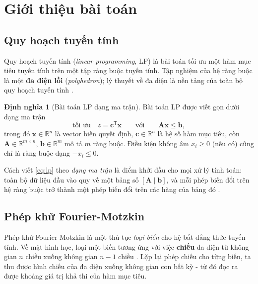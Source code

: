 \documentclass[12pt,a4paper]{article}
\theoremstyle{definition}
\newtheorem{definition}{Định nghĩa}[section]
\newcommand{\R}{\mathbb{R}}
\newcommand{\vx}{\mathbf{x}}
\newcommand{\vc}{\mathbf{c}}
\newcommand{\vb}{\mathbf{b}}
\newcommand{\mA}{\mathbf{A}}
\newcommand{\T}{^{\mathsf T}}
\begin{document}
\bigskip

\section{Giới thiệu bài toán}

\subsection{Quy hoạch tuyến tính}

Quy hoạch tuyến tính (\emph{linear programming}, LP) là bài toán tối ưu một
hàm mục tiêu tuyến tính trên một tập ràng buộc tuyến tính. Tập nghiệm của hệ
ràng buộc là một \textbf{đa diện lồi} (\emph{polyhedron}); lý thuyết về đa diện
là nền tảng của toàn bộ quy hoạch tuyến tính \cite{bertsimas1997}.

\begin{definition}[Bài toán LP dạng ma trận]
Bài toán LP được viết gọn dưới dạng ma trận
\begin{equation}
    \text{tối ưu}\quad z = \vc\T\vx
    \qquad\text{với}\qquad \mA\vx \le \vb,
    \label{eq:lp}
\end{equation}
trong đó $\vx \in \R^{n}$ là vector biến quyết định, $\vc \in \R^{n}$ là hệ số
hàm mục tiêu, còn $\mA \in \R^{m\times n}$, $\vb \in \R^{m}$ mô tả $m$ ràng
buộc. Điều kiện không âm $x_i \ge 0$ (nếu có) cũng chỉ là ràng buộc dạng
$-x_i \le 0$.
\end{definition}

Cách viết \eqref{eq:lp} theo \emph{dạng ma trận} là điểm khởi đầu cho mọi xử
lý tính toán: toàn bộ dữ liệu đầu vào quy về một bảng số $[\mA \mid \vb]$, và
mỗi phép biến đổi trên hệ ràng buộc trở thành một phép biến đổi trên các hàng
của bảng đó \cite{vanderbei2014}.

\subsection{Phép khử Fourier-Motzkin}

Phép khử Fourier-Motzkin là một thủ tục \emph{loại biến} cho hệ bất đẳng
thức tuyến tính. Về mặt hình học, loại một biến tương ứng với việc \textbf{chiếu}
đa diện từ không gian $n$ chiều xuống không gian $n-1$ chiều
\cite{bertsimas1997, schrijver1986}. Lặp lại phép chiếu cho từng biến, ta thu
được hình chiếu của đa diện xuống không gian con bất kỳ - từ đó đọc ra được
khoảng giá trị khả thi của hàm mục tiêu.
\end{document}
